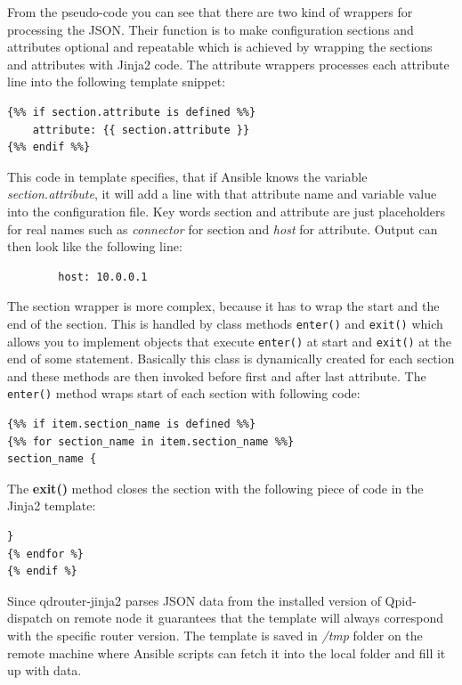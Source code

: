From the pseudo-code you can see that there are two kind of wrappers for processing the JSON. Their function is to make configuration sections and attributes optional and repeatable which is achieved by wrapping the sections and attributes with Jinja2 code. The attribute wrappers processes each attribute line into the following template snippet:

\begin{verbatim}
{%% if section.attribute is defined %%}
    attribute: {{ section.attribute }}
{%% endif %%}
\end{verbatim}

This code in template specifies, that if Ansible knows the variable \emph{section.attribute}, it will add a line with that attribute name and variable value into the configuration file. Key words section and attribute are just placeholders for real names such as \emph{connector} for section and \emph{host} for attribute. Output can then look like the following line:

\begin{verbatim}
		host: 10.0.0.1
\end{verbatim}

The section wrapper is more complex, because it has to wrap the start and the end of the section. This is handled by class methods \texttt{\textunderscore enter\textunderscore ()} and \texttt{\textunderscore exit\textunderscore ()} which allows you to implement objects that execute \texttt{\textunderscore enter\textunderscore ()} at start and \texttt{\textunderscore exit\textunderscore ()} at the end of some statement. Basically this class is dynamically created for each section and these methods are then invoked before first and after last attribute. The \texttt{\textunderscore enter\textunderscore ()} method wraps start of each section with following code:

\begin{verbatim}
{%% if item.section_name is defined %%}
{%% for section_name in item.section_name %%}
section_name {
\end{verbatim}

The \textbf{\textunderscore exit\textunderscore ()} method closes the section with the following piece of code in the Jinja2 template:
\begin{verbatim}
}
{% endfor %}
{% endif %}
\end{verbatim}

Since qdrouter-jinja2 parses JSON data from the installed version of Qpid-dispatch on remote node it guarantees that the template will always correspond with the specific router version. The template is saved in \emph{/tmp} folder on the remote machine where Ansible scripts can fetch it into the local folder and fill it up with data.

